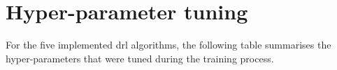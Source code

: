 \chapter{Hyper-parameter tuning} \label{app:hyperparameter_tuning}

For the five implemented \acrlong{drl} algorithms, the following table summarises the hyper-parameters that were tuned during the training process.

